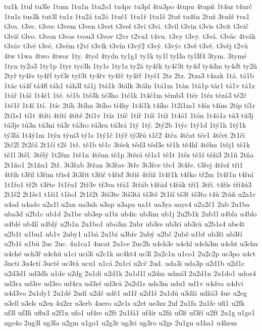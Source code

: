 {tu1k
1tul
tu3le
1tum
1tu1n
1tu2o1
tu4pc
tu3pl
4tu3po
4tupu
4tupň
1t4ur
t4urč
1tu1s
tus3k
tut3l
tu1z
1tu2á
tu2ó
1tuč1
1tu1ř
1tu1š
2tuť
tu4ťn
2tuž
3tužš
tva1
t3va.
t3ve.
t3vec
t3vem
t3ven
t3vet
t3veš
t3vi
t3vi.
t3vil
t3vin
t3vis
t3vit
t3vič
t3viš
t3vo.
t3von
t3vos
tvou3
t3vov
t2vr
t2vu1
t4vu.
t3vy
t3vy.
t3vá.
t3vác
4tvák
t3váv
t3vé
t3vé.
t3vém
t2ví
t3vík
t3vín
t3vý2
t3vý.
t3výc
t3vě
t3vě.
t3věj
t2vů
4tw
t1wa
4two
4twor
1ty.
4tyd
4tydn
ty1g1
ty1k
ty1l
tyl3a
tyl3f4
3tym.
3tymé
1tyn
ty2o3
1ty1p
1tyr
tyr3h
1ty1s
1ty1z
ty2á
ty4čk
ty4č3t
ty4ď
ty4ďm
ty4ďt
ty2ň
2tyř
ty4ře
ty4řf
tyř3r
tyř3t
ty4řv
ty4řč
ty4řř
1tyš1
2tz
2tz.
2tza3
t4zak
1tá.
tá1b
1tác
tá4f
tá4fl
táh1
táh3l
tá1j
1tá1k
3tálk
3táln
1tá1m
1tán
1tá1p
tár1
tá1v
tá1z
1tář
1táš
1t4é1
1té.
té1b
1té3h
té3ho
1té1k
1t4é1m
témb3
1tér
1téz
tézá3
té2č
1té1ř
1t4í
1tí.
1tíc
2tíh
3tíhn
3tího
tí4hy
1t4í1k
t4íko
1t2í1m1
t4ín
t4íns
2típ
tí1r
2tí1s1
tí1t
4títi
4títí
4títě
2tí1v
1tíz
1tíč
1tíř
1tíš
1tíž
1t4ó1
1tón
1t4ó1z
tú3
tú3j
tú3je
tú3n
tú3ni
tú3r
tú3ro
tú3ru
tú3rá
1tý
1tý.
2tý2b
1týc
1tý1d
1tý1h
1tý1k
tý3lá
1t4ý1m
1týn
týni3
tý1s
1tý1č
1týř
tý3řů
t1č2
4tča
4tčat
tče1
4tčet
2t1či
2tč2l
2t2čá
2t1čí
t2ě
1tě.
tě1b
tě1c
3těck
těd3
těd3e
tě1h
tě4hl
4těhu
1těj1
tě1k
tě1l
3těl.
3tělý
1t2ěm
1tě1n
4těnn
tě1p
3těrá
tě1s1
tě1t
1těz
tě1š
těži3
2t1ň
2tňa
2t1ňo1
2t1ňu1
2tř.
3t3řab
3třan
3t3řav
3třc
3t3řce
tře1
3t4ře.
t3řej
4třež
tři1
4třih
t3řil
t3řim
třis4
3t3řit
t3řič
t4řiď
3třiš
4třiž
1t4ř1k
t4řko
tř2m
1t4ř1n
t4řní
1t1řo1
tř2t
t3řte
1t1řu1
2tř3v
tř3va
třá1
3třáb
t4řád
t4řák
tří1
3tří.
t4řís
tří4ú3
2t1š2
2t1še1
t1ši1
t1šo1
2t1š2t
3tš3te
3tš3tá
tš3tě
2t1ší
tš3ť
tš3ťo
t4ů
2tůň
u2a1c
u4ad
u4ado
u2a1l
u2an
ua3nh
u3ap
u3apa
ua1t
ua3ya
uays4
u2a2č1
2ub
2u1ba
uba3d
u2b1c
ub1d
2u1be
ub3ep
u1bi
ub4ic
ub3im
ub1j
2u2b1k
2ub1l
u4bla
u4blo
u4blé
ub4lí
u4blý
u2b1n
2u1bo1
ubo3m
2ubr
ub3re
ub3ri
ub3rů
u2b1s4
ubs4t
u2b1t
u1bu1
ub1v
2uby1
u1bá
2u1bí
u3bív
2ubý
u2bč
2ubě
u1bř
ub3ři
ub3ří
u2b1š
u1bů
2uc
2uc.
4u1ca1
4ucat
2u1ce
2uc2h
u4ch3c
u4chl
u4ch3m
u4cht
u3chu
u4ché
uch3ř
u4chů
u1ci
uci3i
u2c1k
uc4kt4
uc3l
2u2c1n
u1co1
2u2c2p
uc3po
u4ct
3ucti
3u4ctí
3uctě
uc3tů
ucu1
u1cá
2u1cí
u2cč
2ud.
uda3i
uda3p
u2d1b
u2d1c
u2d3d1
ud3dh
u1de
u2dg
2u1di
u2d1k
2u1d1l
u2dm
udmi3
2u2d1n
2u1do1
udoz4
ud3ra
ud3re
ud3ro
ud4ru
ud3ré
ud3rů
2u2d1s
uds3m
udu1
ud1v
u4dva
u4dvi
u4d3vo
2u1dy1
2u1dé
2udí
u2dč
udě1
ud1ř
u2d1š
2u1dů
u3dži
udžá3
4ue
u2eg
u3ell
u3els
u2en
4u2er
u3erb
4uero
u2e1s
u2et
ue3zz
2uf
2u1fa
2u1fe
ufi1
u2fk
uf3l
uf3li
uflu3
u2f1n
ufo1
uf4re
u2ft
2u1fá1
uf4ír
u2fň
uf3ř
uf3ří
u2fť
2u1g
u1ge1
uge4o
2ug3l
ug3la
u2gm
u1go1
u2g3r
ug3ri
ug3ro
u2gs
2u1gu
u1ha1
u4hem
}
